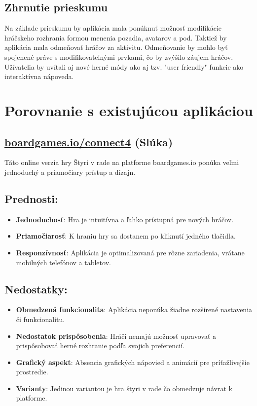 \documentclass[a4paper, 11pt, onecolumn]{article}
\begin{document}
\subsection*{Zhrnutie prieskumu}
Na základe prieskumu by aplikácia mala ponúknuť možnosť modifikácie hráčskeho rozhrania formou menenia pozadia, avatarov a pod. Taktiež by aplikácia mala odmeňovať
hráčov za aktivitu. Odmeňovanie by mohlo byť spojenené práve s modifikovateľnými prvkami, čo by zvýšilo záujem hráčov.
Užívatelia by uvítali aj nové herné módy ako aj tzv. "user friendly" funkcie ako interaktívna nápoveda.
\section{Porovnanie s existujúcou aplikáciou}
\subsection{\href{https://boardgames.io/en/connect4/gameEnd}{boardgames.io/connect4} (Slúka)}

Táto online verzia hry Štyri v rade na platforme boardgames.io ponúka veľmi jednoduchý a 
priamočiary prístup a dizajn.

\subsection*{Prednosti:}
\begin{itemize}
    \item \textbf{Jednoduchosť}: Hra je intuitívna a ľahko prístupná pre nových hráčov.
    \item \textbf{Priamočiarosť}: K hraniu hry sa dostanem po kliknutí jedného tlačidla. 
    \item \textbf{Responzívnosť}: Aplikácia je optimalizovaná pre rôzne zariadenia, vrátane mobilných telefónov a tabletov.
\end{itemize}

\subsection*{Nedostatky:}
\begin{itemize}
    \item \textbf{Obmedzená funkcionalita}: Aplikácia neponúka žiadne rozšírené nastavenia či funkcionalitu.
    \item \textbf{Nedostatok prispôsobenia}: Hráči nemajú možnosť upravovať a prispôsobovať herné rozhranie podľa svojich preferencií.
    \item \textbf{Grafický aspekt}: Absencia grafických nápovied a animácií pre príťažlivejšie prostredie.
    \item \textbf{Varianty}: Jedinou variantou je hra štyri v rade čo obmedzuje návrat k platforme.
\end{itemize}
\end{document}
